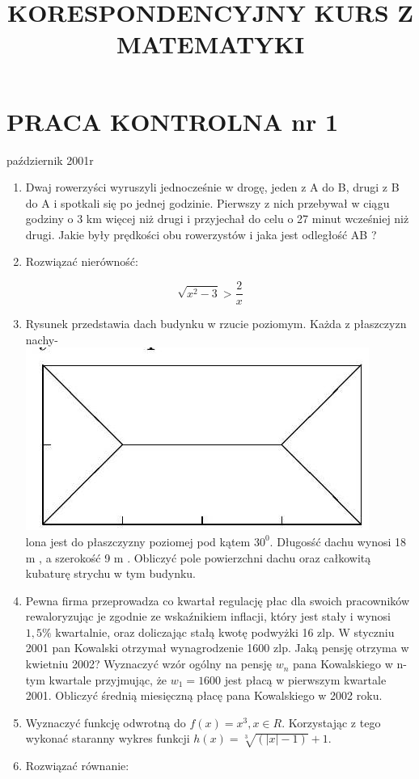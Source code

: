 \documentclass[10pt]{article}
\title{KORESPONDENCYJNY KURS Z MATEMATYKI }
\author{}
\date{}
\begin{document}
\maketitle
\section*{PRACA KONTROLNA nr 1}
październik 2001r

\begin{enumerate}
  \item Dwaj rowerzyści wyruszyli jednocześnie w drogę, jeden z A do B, drugi z B do A i spotkali się po jednej godzinie. Pierwszy z nich przebywał w ciągu godziny o 3 km więcej niż drugi i przyjechał do celu o 27 minut wcześniej niż drugi. Jakie były prędkości obu rowerzystów i jaka jest odległość AB ?
  \item Rozwiązać nierówność:
\end{enumerate}

$$
\sqrt{x^{2}-3}>\frac{2}{x}
$$

\begin{enumerate}
  \setcounter{enumi}{2}
  \item Rysunek przedstawia dach budynku w rzucie poziomym. Każda z płaszczyzn nachy-\\
\includegraphics[max width=\textwidth, center]{2024_11_16_494cb7fdc7ec8837e754g-1}\\
lona jest do płaszczyzny poziomej pod kątem $30^{0}$. Długosść dachu wynosi 18 m , a szerokość 9 m . Obliczyć pole powierzchni dachu oraz całkowitą kubaturę strychu w tym budynku.
  \item Pewna firma przeprowadza co kwartał regulację płac dla swoich pracowników rewaloryzując je zgodnie ze wskaźnikiem inflacji, który jest stały i wynosi $1,5 \%$ kwartalnie, oraz doliczając stałą kwotę podwyżki 16 zlp. W styczniu 2001 pan Kowalski otrzymał wynagrodzenie 1600 zlp. Jaką pensję otrzyma w kwietniu 2002? Wyznaczyć wzór ogólny na pensję $w_{n}$ pana Kowalskiego w n-tym kwartale przyjmując, że $w_{1}=1600$ jest płacą w pierwszym kwartale 2001. Obliczyć średnią miesięczną płacę pana Kowalskiego w 2002 roku.
  \item Wyznaczyć funkcję odwrotną do $f(x)=x^{3}, x \in R$. Korzystając z tego wykonać staranny wykres funkcji $h(x)=\sqrt[3]{(|x|-1)}+1$.
  \item Rozwiązać równanie:
\end{enumerate}
\end{document}
